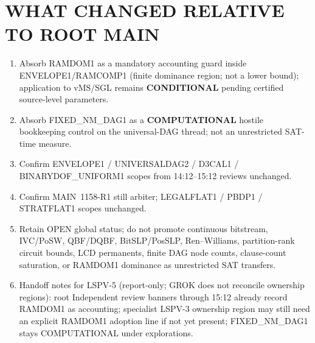 \documentclass[11pt]{article}
\begin{document}
\section*{WHAT CHANGED RELATIVE TO ROOT MAIN}
\begin{enumerate}
\item Absorb RAMDOM1 as a mandatory accounting guard inside ENVELOPE1/RAMCOMP1
(finite dominance region; not a lower bound); application to vMS/SGL remains
\textbf{CONDITIONAL} pending certified source-level parameters.
\item Absorb FIXED\_NM\_DAG1 as a \textbf{COMPUTATIONAL} hostile bookkeeping control on
the universal-DAG thread; not an unrestricted SAT-time measure.
\item Confirm ENVELOPE1 / UNIVERSALDAG2 / D3CAL1 / BINARYDOF\_UNIFORM1 scopes from
14:12--15:12 reviews unchanged.
\item Confirm MAIN~1158-R1 still arbiter; LEGALFLAT1 / PBDP1 / STRATFLAT1 scopes unchanged.
\item Retain OPEN global status; do not promote continuous bitstream, IVC/PoSW,
QBF/DQBF, BitSLP/PosSLP, Ren--Williams, partition-rank circuit bounds, LCD permanents,
finite DAG node counts, clause-count saturation, or RAMDOM1 dominance as unrestricted
SAT transfers.
\item Handoff notes for LSPV-5 (report-only; GROK does not reconcile ownership regions):
root Independent review banners through 15:12 already record RAMDOM1 as accounting;
specialist LSPV-3 ownership region may still need an explicit RAMDOM1 adoption line if
not yet present; FIXED\_NM\_DAG1 stays COMPUTATIONAL under explorations.
\end{enumerate}
\end{document}
